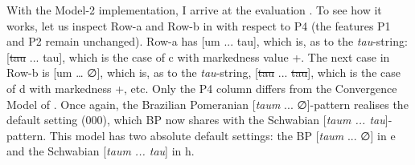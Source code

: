 \documentclass[output=paper,hidelinks,draftmode]{langscibook}
\begin{document}
With the Model-2 implementation, I arrive at the evaluation . To see how it works, let us inspect Row-a and Row-b in  with respect to P4 (the features P1 and P2 remain unchanged). Row-a has [um ... tau], which is, as to the \textit{tau}-string: [\sout{tau} ... tau], which is the case of c with markedness value +. The next case in Row-b is [um … ∅], which is, as to the \textit{tau}-string, [\sout{tau} ... \sout{tau}], which is the case of d with markedness +, etc. Only the P4 column differs from the Convergence Model of . Once again, the Brazilian Pomeranian [\textit{taum} ... ∅]-pattern realises the default setting (000), which BP now shares with the Schwabian [\textit{taum ... tau}]-pattern. This model has two absolute default settings: the BP [\textit{taum} ... ∅] in e and the Schwabian [\textit{taum ... tau}] in h.
\end{document}
